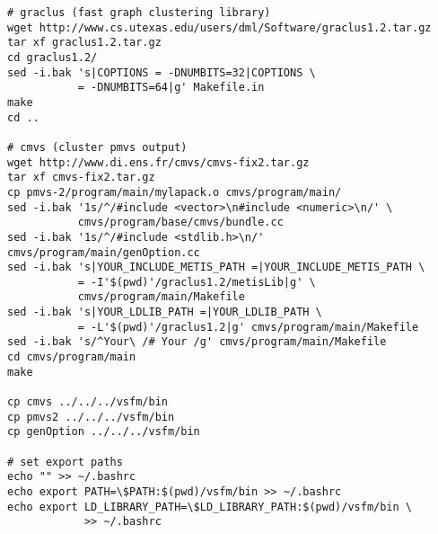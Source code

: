 \begin{verbatim} 
# graclus (fast graph clustering library)
wget http://www.cs.utexas.edu/users/dml/Software/graclus1.2.tar.gz
tar xf graclus1.2.tar.gz
cd graclus1.2/
sed -i.bak 's|COPTIONS = -DNUMBITS=32|COPTIONS \
           = -DNUMBITS=64|g' Makefile.in
make
cd ..

# cmvs (cluster pmvs output)
wget http://www.di.ens.fr/cmvs/cmvs-fix2.tar.gz
tar xf cmvs-fix2.tar.gz
cp pmvs-2/program/main/mylapack.o cmvs/program/main/
sed -i.bak '1s/^/#include <vector>\n#include <numeric>\n/' \
           cmvs/program/base/cmvs/bundle.cc
sed -i.bak '1s/^/#include <stdlib.h>\n/' cmvs/program/main/genOption.cc
sed -i.bak 's|YOUR_INCLUDE_METIS_PATH =|YOUR_INCLUDE_METIS_PATH \
           = -I'$(pwd)'/graclus1.2/metisLib|g' \
           cmvs/program/main/Makefile
sed -i.bak 's|YOUR_LDLIB_PATH =|YOUR_LDLIB_PATH \
           = -L'$(pwd)'/graclus1.2|g' cmvs/program/main/Makefile
sed -i.bak 's/^Your\ /# Your /g' cmvs/program/main/Makefile
cd cmvs/program/main
make

cp cmvs ../../../vsfm/bin
cp pmvs2 ../../../vsfm/bin
cp genOption ../../../vsfm/bin

# set export paths
echo "" >> ~/.bashrc
echo export PATH=\$PATH:$(pwd)/vsfm/bin >> ~/.bashrc
echo export LD_LIBRARY_PATH=\$LD_LIBRARY_PATH:$(pwd)/vsfm/bin \
            >> ~/.bashrc
\end{verbatim}




